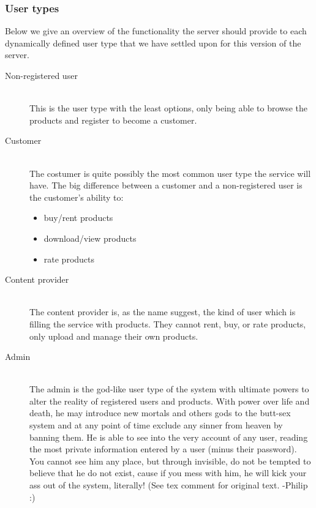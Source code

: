 \subsubsection{User types}
\label{s_actor-goal-list}
Below we give an overview of the functionality the server should provide to each dynamically defined user type that we have settled upon for this version of the server.

\begin{description}
	\item [Non-registered user] \hfill \\
		This is the user type with the least options, only being able to browse the products and register to become a customer.
	\item [Customer]  \hfill \\
		The costumer is quite possibly the most common user type the service will have. The big difference between a customer and a non-registered user is the customer's ability to:
		\begin{itemize}
			\item buy/rent products
			\item download/view products
			\item rate products
		\end{itemize}
	\item [Content provider] \hfill \\
		The content provider is, as the name suggest, the kind of user which is filling the service with products. They cannot rent, buy, or rate products, only upload and manage their own products.
	\item [Admin] \hfill \\
		The admin is the god-like user type of the system with ultimate powers to alter the reality of registered users and products. With power over life and death, he may introduce new mortals and others gods to the butt-sex  system and at any point of time exclude any sinner from heaven by banning them. He is able to see into the very account of any user, reading the most private information entered by a user (minus their password). You cannot see him any place, but through invisible, do not be tempted to believe that he do not exist, cause if you mess with him, he will kick your ass out of the system, literally! (See tex comment for original text. -Philip :)
\end{description}